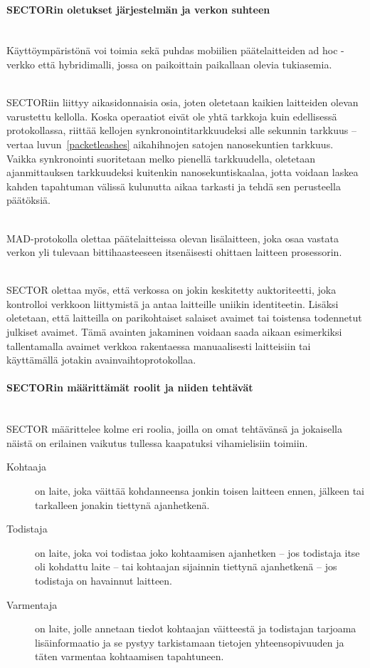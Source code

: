\documentclass[finnish]{tktltiki2}
\theoremstyle{definition}
\theoremstyle{remark}
\begin{document}
\paragraph{SECTORin oletukset järjestelmän ja verkon suhteen}
\noindent \\
Käyttöympäristönä voi toimia sekä puhdas mobiilien päätelaitteiden ad hoc -verkko että hybridimalli, jossa on paikoittain paikallaan olevia tukiasemia. 

\noindent \\
SECTORiin liittyy aikasidonnaisia osia, joten oletetaan kaikien laitteiden olevan varustettu kellolla. Koska operaatiot eivät ole yhtä tarkkoja kuin edellisessä protokollassa, riittää kellojen synkronointitarkkuudeksi alle sekunnin tarkkuus -- vertaa luvun~\ref{packetleashes} aikahihnojen satojen nanosekuntien tarkkuus. Vaikka synkronointi suoritetaan melko pienellä tarkkuudella, oletetaan ajanmittauksen tarkkuudeksi kuitenkin nanosekuntiskaalaa, jotta voidaan laskea kahden tapahtuman välissä kulunutta aikaa tarkasti ja tehdä sen perusteella päätöksiä.

\noindent\\
MAD-protokolla olettaa päätelaitteissa olevan lisälaitteen, joka osaa vastata verkon yli tulevaan bittihaasteeseen itsenäisesti ohittaen laitteen prosessorin.

\noindent\\
SECTOR olettaa myös, että verkossa on jokin keskitetty auktoriteetti, joka kontrolloi verkkoon liittymistä ja antaa laitteille uniikin identiteetin. Lisäksi oletetaan, että laitteilla on parikohtaiset salaiset avaimet tai toistensa todennetut julkiset avaimet. Tämä avainten jakaminen voidaan saada aikaan esimerkiksi tallentamalla avaimet verkkoa rakentaessa manuaalisesti laitteisiin tai käyttämällä jotakin avainvaihtoprotokollaa.

\paragraph{SECTORin määrittämät roolit ja niiden tehtävät}
\label{sector-roles}
\noindent\\
SECTOR määrittelee kolme eri roolia, joilla on omat tehtävänsä ja jokaisella näistä on erilainen vaikutus tullessa kaapatuksi vihamielisiin toimiin.

\begin{description}
\item[Kohtaaja] on laite, joka väittää kohdanneensa jonkin toisen laitteen ennen, jälkeen tai tarkalleen jonakin tiettynä ajanhetkenä.
\item[Todistaja] on laite, joka voi todistaa joko kohtaamisen ajanhetken -- jos todistaja itse oli kohdattu laite -- tai kohtaajan sijainnin tiettynä ajanhetkenä -- jos todistaja on havainnut laitteen.
\item[Varmentaja] on laite, jolle annetaan tiedot kohtaajan väitteestä ja todistajan tarjoama lisäinformaatio ja se pystyy tarkistamaan tietojen yhteensopivuuden ja täten varmentaa kohtaamisen tapahtuneen.
\end{description}
\end{document}
